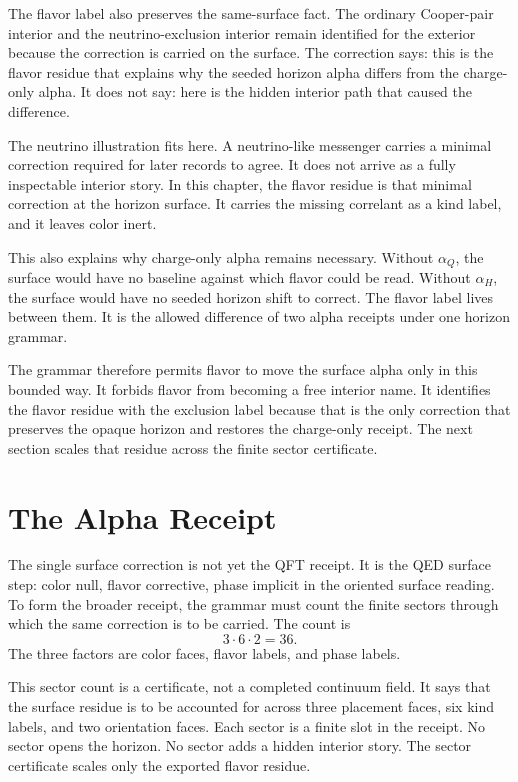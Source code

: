 The flavor label also preserves the same-surface fact. The ordinary
Cooper-pair interior and the neutrino-exclusion interior remain identified
for the exterior because the correction is carried on the surface. The
correction says: this is the flavor residue that explains why the seeded
horizon alpha differs from the charge-only alpha. It does not say: here is
the hidden interior path that caused the difference.

The neutrino illustration fits here. A neutrino-like messenger carries a
minimal correction required for later records to agree. It does not arrive
as a fully inspectable interior story. In this chapter, the flavor residue
is that minimal correction at the horizon surface. It carries the missing
correlant as a kind label, and it leaves color inert.

This also explains why charge-only alpha remains necessary. Without
\(\alpha_Q\), the surface would have no baseline against which flavor could
be read. Without \(\alpha_H\), the surface would have no seeded horizon
shift to correct. The flavor label lives between them. It is the allowed
difference of two alpha receipts under one horizon grammar.

The grammar therefore permits flavor to move the surface alpha only in this
bounded way. It forbids flavor from becoming a free interior name. It
identifies the flavor residue with the exclusion label because that is the
only correction that preserves the opaque horizon and restores the
charge-only receipt. The next section scales that residue across the finite
sector certificate.

\section{The Alpha Receipt}

The single surface correction is not yet the QFT receipt. It is the QED
surface step: color null, flavor corrective, phase implicit in the oriented
surface reading. To form the broader receipt, the grammar must count the
finite sectors through which the same correction is to be carried. The count
is
\[
  3 \cdot 6 \cdot 2 = 36.
\]
The three factors are color faces, flavor labels, and phase labels.

This sector count is a certificate, not a completed continuum field. It says
that the surface residue is to be accounted for across three placement
faces, six kind labels, and two orientation faces. Each sector is a finite
slot in the receipt. No sector opens the horizon. No sector adds a hidden
interior story. The sector certificate scales only the exported flavor
residue.

